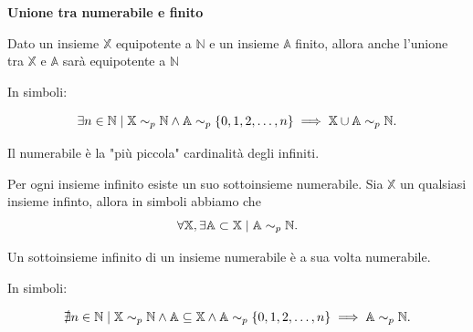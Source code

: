 \begin{theorem}
    \textbf{Unione tra numerabile e finito}

    Dato un insieme $\mathbb{X}$ equipotente a $\mathbb{N}$ e un insieme $\mathbb{A}$ finito,
    allora anche l'unione tra $\mathbb{X}$ e $\mathbb{A}$ sarà equipotente a $\mathbb{N}$

    In simboli:
    
    \[
        \exists n \in\mathbb{N} \mid
            \mathbb{X} \sim_p \mathbb{N} \land
            \mathbb{A}\sim_p\left\{0,1,2,\ldots, n\right\}
        \implies \mathbb{X} \cup\mathbb{A}\sim_p\mathbb{N}.
    \]
\end{theorem}

\begin{proposition}
    Il numerabile è la "più piccola" cardinalità degli infiniti.
\end{proposition}

\begin{proposition}
    Per ogni insieme infinito esiste un suo sottoinsieme numerabile.
    Sia $\mathbb{X}$ un qualsiasi insieme infinto, allora in simboli abbiamo che
    \[\forall \mathbb{X}, \exists \mathbb{A}\subset\mathbb{X} \mid \mathbb{A}\sim_p\mathbb{N}.\]
\end{proposition}

\begin{proposition}\label{pro:sot-inf-num}
    Un sottoinsieme infinito di un insieme numerabile è a sua volta numerabile.

    In simboli:
    
    
    \[
        \nexists n \in\mathbb{N} \mid
            \mathbb{X} \sim_p \mathbb{N} \land
            \mathbb{A} \subseteq \mathbb{X} \land
            \mathbb{A}\sim_p\left\{0,1,2,\ldots, n\right\}
        \implies \mathbb{A}\sim_p\mathbb{N}.
    \]
\end{proposition}

